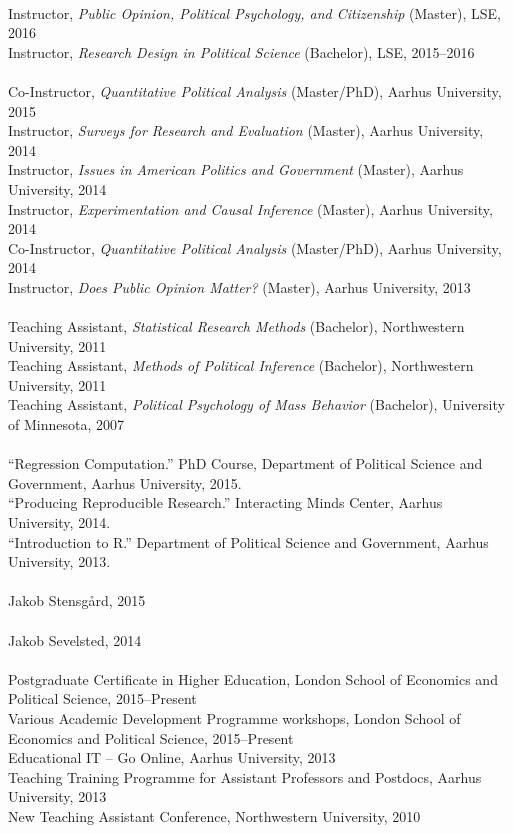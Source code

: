 \documentclass[12pt]{article}
\renewcommand{\section}[1]{\pagebreak[3]%
    \llap{\scshape\smash{\parbox[t]{\marginparwidth}{\raggedright {\color{lg}#1}}}}%
    \vspace{-\baselineskip}\par}
\newcommand{\topic}[1]{\pagebreak[3]\indent {\color{lg}{\footnotesize #1 }}\\}
\newcommand{\entry}[1]{\indent {\color{lg}\guillemotright}\hspace{2pt}#1\vspace{.25em}\\}
\begin{document}
\section{Teaching and Advising}
\topic{Experience: London School of Economics and Political Science}
\entry{Instructor, {\em Public Opinion, Political Psychology, and Citizenship} (Master), LSE, 2016}
\entry{Instructor, {\em Research Design in Political Science} (Bachelor), LSE, 2015--2016}
\topic{Experience: Aarhus University}
\entry{Co-Instructor, {\em Quantitative Political Analysis} (Master/PhD), Aarhus University, 2015}
\entry{Instructor, {\em Surveys for Research and Evaluation} (Master), Aarhus University, 2014}
\entry{Instructor, {\em Issues in American Politics and Government} (Master), Aarhus University, 2014}
\entry{Instructor, {\em Experimentation and Causal Inference} (Master), Aarhus University, 2014}
\entry{Co-Instructor, {\em Quantitative Political Analysis} (Master/PhD), Aarhus University, 2014}
\entry{Instructor, {\em Does Public Opinion Matter?} (Master), Aarhus University, 2013}
\topic{Experience: Northwestern University}
\entry{Teaching Assistant, {\em Statistical Research Methods} (Bachelor), Northwestern University, 2011} %
\entry{Teaching Assistant, {\em Methods of Political Inference} (Bachelor), Northwestern University, 2011} %
\entry{Teaching Assistant, {\em Political Psychology of Mass Behavior} (Bachelor), University of Minnesota, 2007} %

\topic{Short courses}
\entry{``Regression Computation.'' PhD Course, Department of Political Science and Government, Aarhus University, 2015.}
\entry{``Producing Reproducible Research.'' Interacting Minds Center, Aarhus University, 2014.}
\entry{``Introduction to R.'' Department of Political Science and Government, Aarhus University, 2013.}

\topic{Master Advising, Aarhus University}
\entry{Jakob Stensg{\aa}rd, 2015}

\topic{Internship Supervision, Aarhus University}
\entry{Jakob Sevelsted, 2014}

\topic{Pedagogical Training}
\entry{Postgraduate Certificate in Higher Education, London School of Economics and Political Science, 2015--Present}
\entry{Various Academic Development Programme workshops, London School of Economics and Political Science, 2015--Present}
\entry{Educational IT -- Go Online, Aarhus University, 2013}
\entry{Teaching Training Programme for Assistant Professors and Postdocs, Aarhus University, 2013}
\entry{New Teaching Assistant Conference, Northwestern University, 2010}
\end{document}
